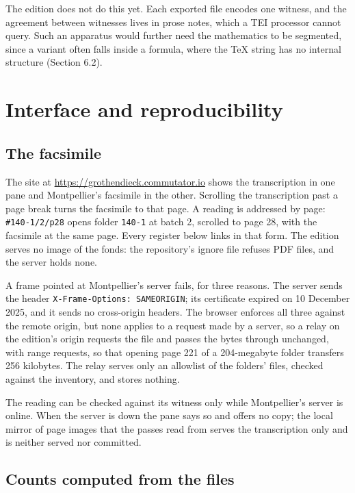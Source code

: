 \documentclass[11pt]{article}
\begin{document}
The edition does not do this yet. Each exported file encodes one witness, and the agreement between witnesses lives in prose notes, which a TEI processor cannot query. Such an apparatus would further need the mathematics to be segmented, since a variant often falls inside a formula, where the TeX string has no internal structure (Section 6.2).

\section{Interface and reproducibility}

\subsection{The facsimile}

The site at \url{https://grothendieck.commutator.io} shows the transcription in one pane and Montpellier's facsimile in the other. Scrolling the transcription past a page break turns the facsimile to that page. A reading is addressed by page: \texttt{\#140-1/2/p28} opens folder \texttt{140-1} at batch 2, scrolled to page 28, with the facsimile at the same page. Every register below links in that form. The edition serves no image of the fonds: the repository's ignore file refuses PDF files, and the server holds none.

A frame pointed at Montpellier's server fails, for three reasons. The server sends the header \texttt{X-Frame-Options: SAMEORIGIN}; its certificate expired on 10 December 2025, and it sends no cross-origin headers. The browser enforces all three against the remote origin, but none applies to a request made by a server, so a relay on the edition's origin requests the file and passes the bytes through unchanged, with range requests, so that opening page 221 of a 204-megabyte folder transfers 256 kilobytes. The relay serves only an allowlist of the folders' files, checked against the inventory, and stores nothing.

The reading can be checked against its witness only while Montpellier's server is online. When the server is down the pane says so and offers no copy; the local mirror of page images that the passes read from serves the transcription only and is neither served nor committed.

\subsection{Counts computed from the files}
\end{document}

